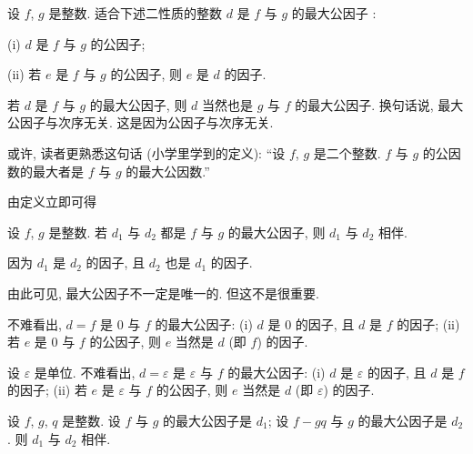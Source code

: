 \begin{definition}
    设 $f$, $g$ 是整数. 适合下述二性质的整数 $d$ 是 $f$ 与 $g$ 的最大公因子 :

    (i) $d$ 是 $f$ 与 $g$ 的公因子;

    (ii) 若 $e$ 是 $f$ 与 $g$ 的公因子, 则 $e$ 是 $d$ 的因子.
\end{definition}

\begin{remark}
    若 $d$ 是 $f$ 与 $g$ 的最大公因子, 则 $d$ 当然也是 $g$ 与 $f$ 的最大公因子. 换句话说, 最大公因子与次序无关. 这是因为公因子与次序无关.
\end{remark}

\begin{remark}
    或许, 读者更熟悉这句话 (小学里学到的定义): ``设 $f$, $g$ 是二个整数. $f$ 与 $g$ 的公因数的最大者是 $f$ 与 $g$ 的最大公因数.''
\end{remark}

由定义立即可得
\begin{proposition}
    设 $f$, $g$ 是整数. 若 $d_1$ 与 $d_2$ 都是 $f$ 与 $g$ 的最大公因子, 则 $d_1$ 与 $d_2$ 相伴.
\end{proposition}

\begin{pf}
    因为 $d_1$ 是 $d_2$ 的因子, 且 $d_2$ 也是 $d_1$ 的因子.
\end{pf}

\begin{remark}
    由此可见, 最大公因子不一定是唯一的. 但这不是很重要.
\end{remark}

\begin{example}
    不难看出, $d = f$ 是 $0$ 与 $f$ 的最大公因子: (i) $d$ 是 $0$ 的因子, 且 $d$ 是 $f$ 的因子; (ii) 若 $e$ 是 $0$ 与 $f$ 的公因子, 则 $e$ 当然是 $d$ (即 $f$) 的因子.
\end{example}

\begin{example}
    设 $\varepsilon$ 是单位. 不难看出, $d = \varepsilon$ 是 $\varepsilon$ 与 $f$ 的最大公因子: (i) $d$ 是 $\varepsilon$ 的因子, 且 $d$ 是 $f$ 的因子; (ii) 若 $e$ 是 $\varepsilon$ 与 $f$ 的公因子, 则 $e$ 当然是 $d$ (即 $\varepsilon$) 的因子.
\end{example}

\begin{proposition}
    设 $f$, $g$, $q$ 是整数. 设 $f$ 与 $g$ 的最大公因子是 $d_1$; 设 $f - gq$ 与 $g$ 的最大公因子是 $d_2$. 则 $d_1$ 与 $d_2$ 相伴.
\end{proposition}

